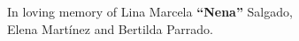 \begin{flushright}
{\large In loving memory of Lina Marcela {\bf ``Nena''} Salgado,\\
Elena Martínez and Bertilda Parrado.}
\end{flushright}
